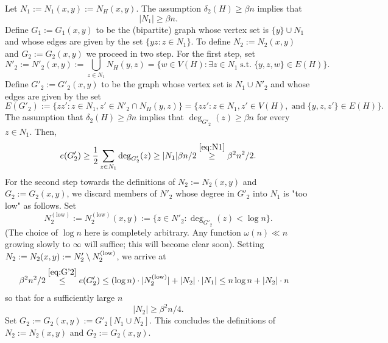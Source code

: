 \documentclass[11pt,reqno]{amsart}
\begin{document}
Let
$
N_1:=N_1(x,y) := N_H(x,y)%
$.
The assumption $\delta_2(H) \geq \beta n$ implies that 
\begin{equation}\label{eq:N1}
|N_1| \geq \beta n. 
\end{equation}
Define $G_1:= G_1(x,y)$ to be the (bipartite) graph whose vertex set is $\{y\} \cup N_1$ and whose edges are given by the set 
$\{yz : z \in N_1\}$. To define $N_2:=N_2(x,y)$ and $G_2 := G_2(x,y)$ we proceed in two step. For the first step, set 
\begin{equation}\label{eq:N'2}
N'_2 := N'_2(x,y):= \bigcup_{z \in N_1} N_H(y,z) = \{w \in V(H): \exists z \in N_1 \; \text{s.t.}\; \{y,z,w\} \in E(H)\}.
\end{equation}
Define $G'_2:=G'_2(x,y)$ to be the graph whose vertex set is $N_1 \cup N'_2$ and whose edges are given by the set 
$$
E(G'_2):=\{zz': z \in N_1, z' \in N'_2\cap  N_H(y,z)\} = \{zz': z \in N_1, z' \in V(H),\; \text{and} \; \{y,z,z'\} \in E(H)  \}.
$$
The assumption that $\delta_2(H) \geq \beta n$ implies that 
$\deg_{G'_2}(z) \geq \beta n$ for every $z \in N_1$. Then, 
\begin{equation}\label{eq:G'2}
e(G'_2) \geq \frac{1}{2}\sum_{z \in N_1} \deg_{G'_2}(z) \geq |N_1|\beta n /2 \overset{\eqref{eq:N1}}{\geq} \beta^2 n^2 / 2.
\end{equation}
For the second step towards the definitions of $N_2:=N_2(x,y)$ and $G_2 := G_2(x,y)$, we discard members of $N'_2$ whose degree in $G'_2$ into $N_1$ is "too low" as follows. Set 
$$
N_2^{(\mathrm{low})}:= N_2^{(\mathrm{low})}(x,y):= \{z \in N'_2: \deg_{G'_2}(z) < \log n\}.
$$
(The choice of $\log n$ here is completely arbitrary. Any function $\omega(n) \ll n$ growing slowly to $\infty$ will suffice; this will become clear soon). 
Setting $N_2 := N_2(x,y) := N'_2 \setminus N_2^{(\mathrm{low})}$, we arrive at 
\begin{align*}
\beta^2 n^2 / 2 \overset{\eqref{eq:G'2}}{\leq} e(G'_2) & \leq (\log n) \cdot |N_2^{(\mathrm{low})}| + |N_2|\cdot |N_1|  \leq n \log n + |N_2|\cdot n
\end{align*}
so that for a sufficiently large $n$
\begin{equation}\label{eq:N2}
|N_2| \geq \beta^2 n / 4. 
\end{equation}
Set $G_2:=G_2(x,y) := G'_2[N_1 \cup N_2]$. This concludes the definitions of $N_2:=N_2(x,y)$ and $G_2 := G_2(x,y)$. 
\end{document}
